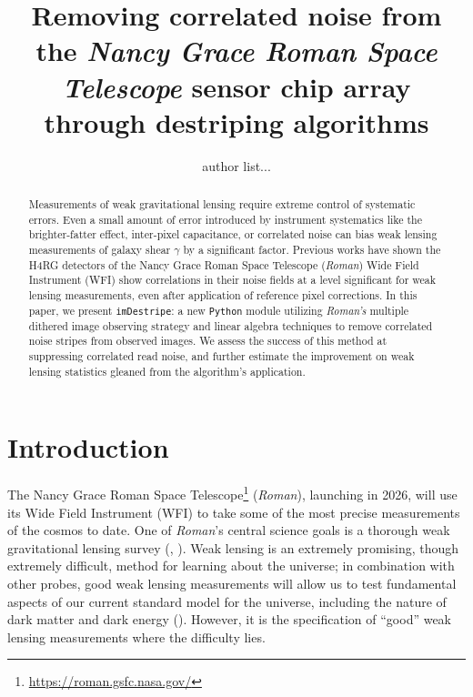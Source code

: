 \documentclass[12pt]{pasj01}
\begin{document}
\title{Removing correlated noise from the {\textit{\textbf{Nancy Grace Roman Space Telescope}}} sensor chip array through destriping algorithms}
\author{author list...}%


\maketitle

\begin{abstract}
Measurements of weak gravitational lensing require extreme control of systematic errors. Even a small amount of error introduced by instrument systematics like the brighter-fatter effect, inter-pixel capacitance, or correlated noise can bias weak lensing measurements of galaxy shear $\gamma$ by a significant factor. Previous works have shown the H4RG detectors of the Nancy Grace Roman Space Telescope (\textit{Roman}) Wide Field Instrument (WFI) show correlations in their noise fields at a level significant for weak lensing measurements, even after application of reference pixel corrections. In this paper, we 
present \texttt{imDestripe}: a new \texttt{Python} module utilizing \textit{Roman's} multiple dithered image observing strategy and linear algebra techniques to remove correlated noise stripes from observed images. We assess the success of this method at suppressing correlated read noise, and further estimate the improvement on weak lensing statistics gleaned from the algorithm's application.
\end{abstract}

\section{Introduction}

The Nancy Grace Roman Space Telescope\footnote{\url{https://roman.gsfc.nasa.gov/}} (\textit{Roman}), launching in 2026, will use its Wide Field Instrument (WFI) to take some of the most precise measurements of the cosmos to date. One of \textit{Roman}'s central science goals is a thorough weak gravitational lensing survey (\citep{Akeson2019}, \cite{Spergel2015}). Weak lensing is an extremely promising, though extremely difficult, method for learning about the universe; in combination with other probes, good weak lensing measurements will allow us to test fundamental aspects of our current standard model for the universe, including the nature of dark matter and dark energy (\cite{Weinberg2013}). However, it is the specification of ``good'' weak lensing measurements where the difficulty lies. 
\end{document}
